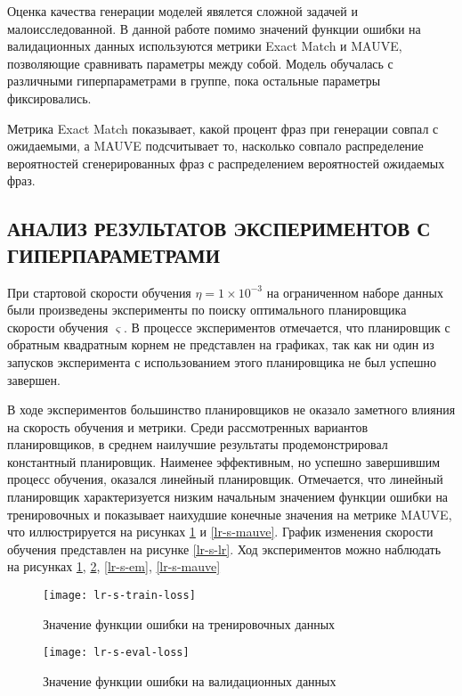 Оценка качества генерации моделей явялется сложной задачей и малоисследованной. В данной работе помимо значений функции ошибки на валидационных данных используются метрики Exact Match и MAUVE, позволяющие сравнивать параметры между собой. Модель обучалась с различными гиперпараметрами в группе, пока остальные параметры фиксировались.

Метрика Exact Match показывает, какой процент фраз при генерации совпал с ожидаемыми, а MAUVE подсчитывает то, насколько совпало распределение вероятностей сгенерированных фраз с распределением вероятностей ожидаемых фраз.

\subsection{АНАЛИЗ РЕЗУЛЬТАТОВ ЭКСПЕРИМЕНТОВ С ГИПЕРПАРАМЕТРАМИ}

При стартовой скорости обучения $\eta = 1 \times 10^{-3}$ на ограниченном наборе данных были произведены эксперименты по поиску оптимального планировщика скорости обучения $\varsigma$. В процессе экспериментов отмечается, что планировщик с обратным квадратным корнем не представлен на графиках, так как ни один из запусков эксперимента с использованием этого планировщика не был успешно завершен.

В ходе экспериментов большинство планировщиков не оказало заметного влияния на скорость обучения и метрики. Среди рассмотренных вариантов планировщиков, в среднем наилучшие результаты продемонстрировал константный планировщик. Наименее эффективным, но успешно завершившим процесс обучения, оказался линейный планировщик. Отмечается, что линейный планировщик характеризуется низким начальным значением функции ошибки на тренировочных и показывает наихудшие конечные значения на метрике MAUVE, что иллюстрируется на рисунках \ref{lr-s-train-loss} и \ref{lr-s-mauve}. График изменения скорости обучения представлен на рисунке \ref{lr-s-lr}. Ход экспериментов можно наблюдать на рисунках \ref{lr-s-train-loss}, \ref{lr-s-eval-loss}, \ref{lr-s-em}, \ref{lr-s-mauve}

\begin{figure}[H]
  \centering
  \texttt{[image: lr-s-train-loss]}
  \caption{Значение функции ошибки на тренировочных данных}
  \label{lr-s-train-loss}
\end{figure}

\begin{figure}[H]
  \centering
  \texttt{[image: lr-s-eval-loss]}
  \caption{Значение функции ошибки на валидационных данных}
  \label{lr-s-eval-loss}
\end{figure}

